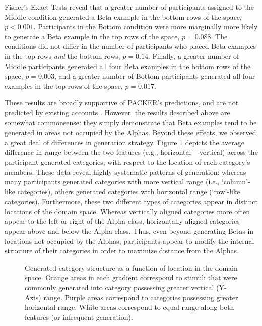 \documentclass[10pt,letterpaper]{article}
\newcommand\inputpgf[2]{{
\let\pgfimageWithoutPath\pgfimage
\renewcommand{\pgfimage}[2][]{\pgfimageWithoutPath[##1]{#1/##2}}

}}
\begin{document}
Fisher's Exact Tests reveal that a greater number of participants assigned to the Middle condition generated a Beta example in the bottom rows of the space, $p < 0.001$. Participants in the Bottom condition were more marginally more likely to generate a Beta example in the top rows of the space, $p = 0.088$. The conditions did not differ in the number of participants who placed Beta examples in the top rows \textit{and} the bottom rows, $p = 0.14$. Finally, a greater number of Middle participants generated all four Beta examples in the bottom rows of the space, $p = 0.003$, and a greater number of Bottom participants generated all four examples in the top rows of the space, $p = 0.017$. 

These results are broadly supportive of PACKER's predictions, and are not predicted by existing accounts \citep[i.e.,][]{jern2013probabilistic}. However, the results described above are somewhat commonsense: they simply demonstrate that Beta examples tend to be generated in areas not occupied by the Alphas. Beyond these effects, we observed a great deal of differences in generation strategy. Figure \ref{fig:range-diff-gradient} depicts the average difference in range between the two features (e.g., horizontal -- vertical) across the participant-generated categories, with respect to the location of each category's members. These data reveal highly systematic patterns of generation: whereas many participants generated categories with more vertical range (i.e., `column'-like categories), others generated categories with horizontal range (`row'-like categories). Furthermore, these two different types of categories appear in distinct locations of the domain space. Whereas vertically aligned categories more often appear to the left or right of the Alpha class, horizontally aligned categories appear above and below the Alpha class. Thus, even beyond generating Betas in locations not occupied by the Alphas, participants appear to modify the internal structure of their categories in order to maximize distance from the Alphas.

\begin{figure}[ht!]
    \begin{center}
    \inputpgf{figs/}{range-diff-gradient.pgf}
    \caption{Generated category structure as a function of location in the domain space. Orange areas in each gradient correspond to stimuli that were commonly generated into category possessing greater vertical (Y-Axis) range. Purple areas correspond to categories possessing greater horizontal range. White areas correspond to equal range along both features (or infrequent generation).}
    \label{fig:range-diff-gradient}
    \end{center}
\end{figure}
\end{document}

